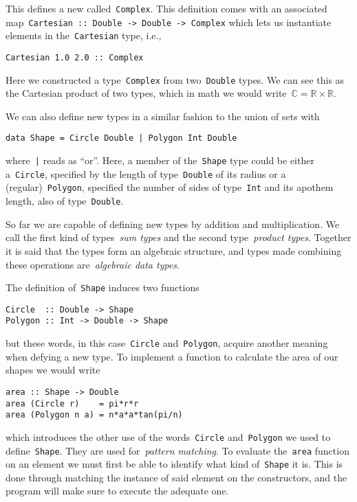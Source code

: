 \documentclass[a4paper]{article}
\theoremstyle{plain}
\theoremstyle{definition}
\newcommand{\ie}{{i}.{e}., }
\begin{document}
This defines a new called~\texttt{Complex}. This definition comes
with an associated
map~\texttt{Cartesian :: Double -> Double -> Complex} which lets us
instantiate elements in the~\texttt{Cartesian} type, \ie
\begin{verbatim}
Cartesian 1.0 2.0 :: Complex
\end{verbatim}

Here we constructed a type~\texttt{Complex} from
two~\texttt{Double} types. We can see this as the Cartesian product
of two types, which in math we would
write~\(\mathbb{C}=\mathbb{R}\times\mathbb{R}\).

We can also define new types in a similar fashion to the union of sets with
\begin{verbatim}
data Shape = Circle Double | Polygon Int Double
\end{verbatim}
where~\texttt{|} reads as ``or''. Here, a member of
the~\texttt{Shape} type could be either
a~\texttt{Circle}, specified by the length of
type~\texttt{Double} of its radius or a
(regular)~\texttt{Polygon}, specified the number of sides of
type~\texttt{Int} and its apothem length, also of
type~\texttt{Double}.

So far we are capable of defining new types by addition and multiplication. We
call the first kind of types~\emph{sum types} and the second type~\emph{product
types}. Together it is said that the types form an algebraic structure, and
types made combining these operations are~\emph{algebraic data types}.

The definition of~\texttt{Shape} induces two functions
\begin{verbatim}
Circle  :: Double -> Shape
Polygon :: Int -> Double -> Shape
\end{verbatim}
but these words, in this case~\texttt{Circle}
and~\texttt{Polygon}, acquire another meaning when defying a new
type. To implement a function to calculate the area of our shapes we would write
\begin{verbatim}
area :: Shape -> Double
area (Circle r)    = pi*r*r
area (Polygon n a) = n*a*a*tan(pi/n)
\end{verbatim}
which introduces the other use of the words~\texttt{Circle}
and~\texttt{Polygon} we used to define~\texttt{Shape}.
They are used for~\emph{pattern matching}. To evaluate
the~\texttt{area} function on an element we must
first be able to identify what kind of~\texttt{Shape} it is. This
is done through matching the instance of said element on the constructors, and
the program will make sure to execute the adequate one.
\end{document}
